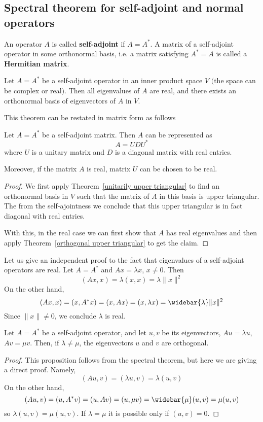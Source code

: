 \subsection{Spectral theorem for self-adjoint and normal operators}
\begin{definition}
An operator $A$ is called \textbf{self-adjoint} if $A=A^*$. A matrix of a self-adjoint operator in some orthonormal basis, i.e. a matrix satisfying $A^*=A$ is called a \textbf{Hermitian matrix}.
\end{definition}
\begin{theorem}
Let $A=A^*$ be a self-adjoint operator in an inner product space $V$ $($the space can be complex or real$)$. Then all eigenvalues of $A$ are real, and there exists an orthonormal basis of eigenvectors of $A$ in $V$.
\end{theorem}
This theorem can be restated in matrix form as follows
\begin{theorem}
Let $A=A^*$ be a self-adjoint matrix. Then $A$ can be represented as
\[A=UDU^*\]
where $U$ is a unitary matrix and $D$ is a diagonal matrix with real entries.\par
Moreover, if the matrix $A$ is real, matrix $U$ can be chosen to be real.
\end{theorem}
\begin{proof}
We first apply Theorem~\ref{unitarily upper triangular} to find an orthonormal basis in $V$ such that the matrix of $A$ in this basis is upper triangular. The from the self-ajointness we conclude that this upper triangular is in fact diagonal with real entries.\par
With this, in the real case we can first show that $A$ has real eigenvalues and then apply Theorem~\ref{orthogonal upper triangular} to get the claim.
\end{proof}
\begin{remark}
Let us give an independent proof to the fact that eigenvalues of a self-adjoint operators are real. Let $A=A^*$ and $Ax=\lambda x$, $x\neq 0$. Then
\[(Ax,x)=\lambda(x,x)=\lambda\|x\|^2\]
On the other hand,
\[(Ax,x)=(x,A^*x)=(x,Ax)=(x,\lambda x)=\widebar{\lambda}\|x\|^2\]
Since $\|x\|\neq 0$, we conclude $\lambda$ is real.
\end{remark}
\begin{proposition}
Let $A=A^*$ be a self-adjoint operator, and let $u,v$ be its eigenvectors, $Au=\lambda u$, $Av=\mu v$. Then, if $\lambda\neq\mu$, the eigenvectors $u$ and
$v$ are orthogonal.
\end{proposition}
\begin{proof}
This proposition follows from the spectral theorem, but here we are giving a direct proof. Namely,
\[(Au,v)=(\lambda u,v)=\lambda(u,v)\]
On the other hand,
\[(Au,v)=(u,A^*v)=(u,Av)=(u,\mu v)=\widebar{\mu}(u,v)=\mu(u,v)\]
so $\lambda(u,v)=\mu(u,v)$. If $\lambda=\mu$ it is possible only if $(u,v)=0$.
\end{proof}
